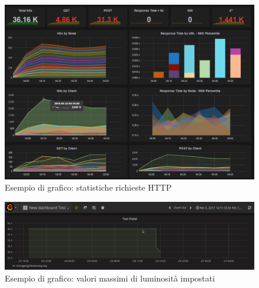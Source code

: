 \begin{figure}[tbp]
	\centering
	\includegraphics[scale=0.43]{figure/grafana_web_hits.png}
	\caption{Esempio di grafico: statistiche richieste HTTP \label{GRAFANA-WEB-HITS}}
\end{figure}
\begin{figure}[tbp]
	\centering
	\includegraphics[scale=0.45]{figure/grafana_real.png}
	\caption{Esempio di grafico: valori massimi di luminosità impostati \label{GRAFANA-REAL}}
\end{figure}


